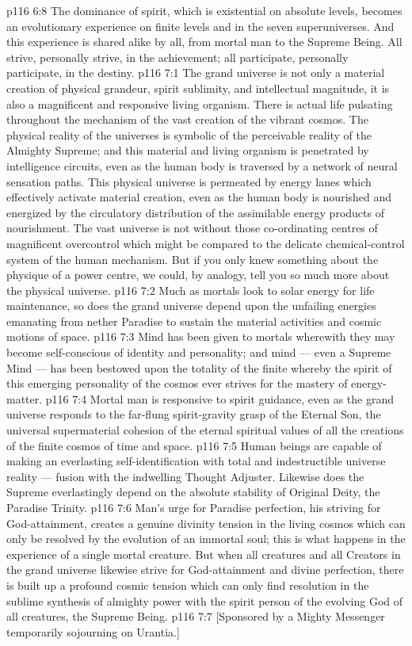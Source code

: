 \vs p116 6:8 The dominance of spirit, which is existential on absolute levels, becomes an evolutionary experience on finite levels and in the seven superuniverses. And this experience is shared alike by all, from mortal man to the Supreme Being. All strive, personally strive, in the achievement; all participate, personally participate, in the destiny.
\vs p116 7:1 The grand universe is not only a material creation of physical grandeur, spirit sublimity, and intellectual magnitude, it is also a magnificent and responsive living organism. There is actual life pulsating throughout the mechanism of the vast creation of the vibrant cosmos. The physical reality of the universes is symbolic of the perceivable reality of the Almighty Supreme; and this material and living organism is penetrated by intelligence circuits, even as the human body is traversed by a network of neural sensation paths. This physical universe is permeated by energy lanes which effectively activate material creation, even as the human body is nourished and energized by the circulatory distribution of the assimilable energy products of nourishment. The vast universe is not without those co\hyp{}ordinating centres of magnificent overcontrol which might be compared to the delicate chemical\hyp{}control system of the human mechanism. But if you only knew something about the physique of a power centre, we could, by analogy, tell you so much more about the physical universe.
\vs p116 7:2 Much as mortals look to solar energy for life maintenance, so does the grand universe depend upon the unfailing energies emanating from nether Paradise to sustain the material activities and cosmic motions of space.
\vs p116 7:3 Mind has been given to mortals wherewith they may become self\hyp{}conscious of identity and personality; and mind --- even a Supreme Mind --- has been bestowed upon the totality of the finite whereby the spirit of this emerging personality of the cosmos ever strives for the mastery of energy\hyp{}matter.
\vs p116 7:4 Mortal man is responsive to spirit guidance, even as the grand universe responds to the far\hyp{}flung spirit\hyp{}gravity grasp of the Eternal Son, the universal supermaterial cohesion of the eternal spiritual values of all the creations of the finite cosmos of time and space.
\vs p116 7:5 Human beings are capable of making an everlasting self\hyp{}identification with total and indestructible universe reality --- fusion with the indwelling Thought Adjuster. Likewise does the Supreme everlastingly depend on the absolute stability of Original Deity, the Paradise Trinity.
\vs p116 7:6 Man’s urge for Paradise perfection, his striving for God\hyp{}attainment, creates a genuine divinity tension in the living cosmos which can only be resolved by the evolution of an immortal soul; this is what happens in the experience of a single mortal creature. But when all creatures and all Creators in the grand universe likewise strive for God\hyp{}attainment and divine perfection, there is built up a profound cosmic tension which can only find resolution in the sublime synthesis of almighty power with the spirit person of the evolving God of all creatures, the Supreme Being.
\vsetoff
\vs p116 7:7 [Sponsored by a Mighty Messenger temporarily sojourning on Urantia.]
\quizlink
